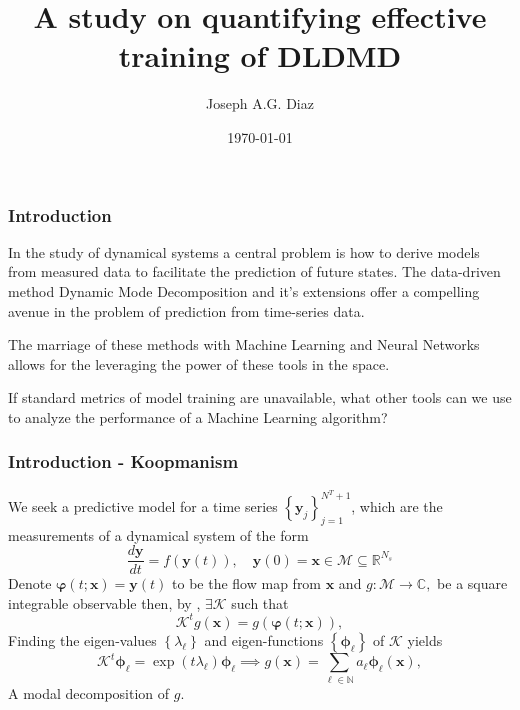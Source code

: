 \documentclass[11pt,aspectratio=169]{beamer}
\title{A study on quantifying effective training of DLDMD}
\author{Joseph A.G. Diaz}
\institute{Master of Science in Applied Mathematics\\ 
           with a Concentration in Dynamical Systems,\\
           San Diego State University}
\date{\today}
\newcommand{\parens}[1]{\left(#1\right)}
\newcommand{\bracks}[1]{\left\{#1\right\}}
\newcommand{\R}{\mathbb{R}}
\newcommand{\N}{\mathbb{N}}
\newcommand{\C}{\mathbb{C}}
\newcommand{\dd}[2]{\frac{d#1}{d#2}}
\begin{document}
    \frame{\titlepage}

    \begin{frame}
        \frametitle{Introduction}

        In the study of dynamical systems a central problem is how to derive models 
        from measured data to facilitate the prediction of future states. The data-driven
        method Dynamic Mode Decomposition and it's extensions offer a compelling avenue
        in the problem of prediction from time-series data.

        The marriage of these methods with Machine Learning and Neural Networks allows for
        the leveraging the power of these tools in the space. 

        If standard metrics of model training are unavailable, what other tools can we use 
        to analyze the performance of a Machine Learning algorithm?
    
    \end{frame}

    \begin{frame}
        \frametitle{Introduction - Koopmanism}
        We seek a predictive model for a time series 
        $\bracks{\boldsymbol{y}_j}_{j=1}^{N^T+1}$, which are the measurements of a 
        dynamical system of the form
        \begin{equation}
            \dd{\boldsymbol{y}}{t} = f\parens{\boldsymbol{y}(t)},\quad \boldsymbol{y}(0) 
            = \boldsymbol{x} \in \mathcal{M} \subseteq \R^{N_s}
        \end{equation}
        Denote $\boldsymbol{\varphi}(t;\boldsymbol{x}) =
        \boldsymbol{y}(t)$ to be the flow map from $\boldsymbol{x}$
        and $g: \mathcal{M} \to \C,$ be a square integrable 
        observable then, by \cite{koopman}, $\exists \mathcal{K}$ such that
        \begin{equation}
            \mathcal{K}^t g(\boldsymbol{x}) = g(\boldsymbol{\varphi}(t; \boldsymbol{x})),
        \end{equation}
        Finding the eigen-values $\bracks{\lambda_\ell}$ and 
        eigen-functions $\bracks{\boldsymbol{\phi}_\ell}$ of $\mathcal{K}$ yields
        \begin{equation}
            \mathcal{K}^t\boldsymbol{\phi}_\ell = \exp(t\lambda_\ell)\boldsymbol{\phi}
            _\ell \implies g(\boldsymbol{x}) = \sum_{\ell \in \N} a_\ell \boldsymbol{\phi}_
            \ell(\boldsymbol{x}),    
        \end{equation}
        A modal decomposition of $g$.

    
    \end{frame}
\end{document}
